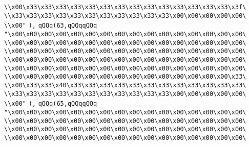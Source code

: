 \verb|\\x00\x33\x33\x33\x33\x33\x33\x33\x33\x33\x33\x33\x33\x33\x33\x3f\|\newline
\verb|\\x33\x33\x33\x33\x33\x33\x33\x33\x33\x33\x33\x00\x00\x00\x00\x00\|\newline
\verb|\\x00"|\newline
\verb|),|\newline
\verb|qQQq(63,qQQqqQQq|\newline
\verb|"\x00\x00\x00\x00\x00\x00\x00\x00\x00\x00\x00\x00\x00\x00\x00\x00\|\newline
\verb|\\x00\x00\x00\x00\x00\x00\x00\x00\x00\x00\x00\x00\x00\x00\x00\x00\|\newline
\verb|\\x00\x00\x00\x00\x00\x00\x00\x00\x00\x00\x00\x00\x00\x00\x00\x00\|\newline
\verb|\\x00\x00\x00\x00\x00\x00\x00\x00\x00\x00\x00\x00\x00\x00\x00\x00\|\newline
\verb|\\x00\x00\x00\x00\x00\x00\x00\x00\x00\x00\x00\x00\x00\x00\x00\x00\|\newline
\verb|\\x00\x00\x00\x00\x00\x00\x00\x00\x00\x00\x00\x00\x00\x00\x00\x33\|\newline
\verb|\\x00\x33\x33\x40\x33\x33\x33\x33\x33\x33\x33\x33\x33\x33\x33\x33\|\newline
\verb|\\x33\x33\x33\x33\x33\x33\x33\x33\x33\x33\x33\x00\x00\x00\x00\x00\|\newline
\verb|\\x00"|\newline
\verb|),|\newline
\verb|qQQq(65,qQQqqQQq|\newline
\verb|"\x00\x00\x00\x00\x00\x00\x00\x00\x00\x00\x00\x00\x00\x00\x00\x00\|\newline
\verb|\\x00\x00\x00\x00\x00\x00\x00\x00\x00\x00\x00\x00\x00\x00\x00\x00\|\newline
\verb|\\x00\x00\x00\x00\x00\x00\x00\x00\x00\x00\x00\x00\x00\x00\x00\x00\|\newline
\verb|\\x00\x00\x00\x00\x00\x00\x00\x00\x00\x00\x00\x00\x00\x00\x00\x00\|\newline
